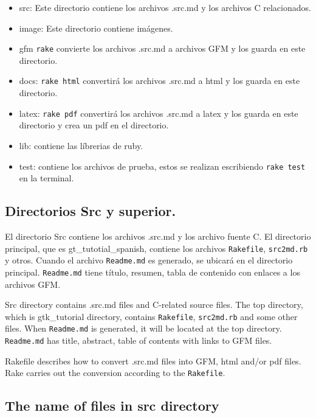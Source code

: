 \begin{itemize}
\tightlist
\item
  src: Este directorio contiene los archivos .src.md y los archivos C
  relacionados.
\item
  image: Este directorio contiene imágenes.
\item
  gfm \texttt{rake} convierte los archivos .src.md a archivos GFM y los
  guarda en este directorio.
\item
  docs: \texttt{rake\ html} convertirá los archivos .src.md a html y los
  guarda en este directorio.
\item
  latex: \texttt{rake\ pdf} convertirá los archivos .src.md a latex y
  los guarda en este directorio y crea un pdf en el directorio.
\item
  lib: contiene las líbrerias de ruby.
\item
  test: contiene los archivos de prueba, estos se realizan escribiendo
  \texttt{rake\ test} en la terminal.
\end{itemize}

\hypertarget{directorios-src-y-superior.}{%
\subsection{Directorios Src y
superior.}\label{directorios-src-y-superior.}}

El directorio Src contiene los archivos .src.md y los archivo fuente C.
El directorio principal, que es gt\_tutotial\_spanish, contiene los
archivos \texttt{Rakefile}, \texttt{src2md.rb} y otros. Cuando el
archivo \texttt{Readme.md} es generado, se ubicará en el directorio
principal. \texttt{Readme.md} tiene título, resumen, tabla de contenido
con enlaces a los archivos GFM.

Src directory contains .src.md files and C-related source files. The top
directory, which is gtk\_tutorial directory, contains \texttt{Rakefile},
\texttt{src2md.rb} and some other files. When \texttt{Readme.md} is
generated, it will be located at the top directory. \texttt{Readme.md}
has title, abstract, table of contents with links to GFM files.

Rakefile describes how to convert .src.md files into GFM, html and/or
pdf files. Rake carries out the conversion according to the
\texttt{Rakefile}.

\hypertarget{the-name-of-files-in-src-directory}{%
\subsection{The name of files in src
directory}\label{the-name-of-files-in-src-directory}}

